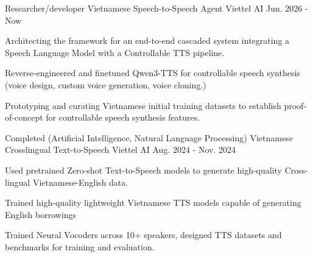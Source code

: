 \begin{cventries}
\cventry
    {Researcher/developer} %
    {Vietnamese Speech-to-Speech Agent} %
    {Viettel AI} %
    {Jun. 2026 - Now} %
    {
      \begin{cvitems} %
         \item Architecting the framework for an end-to-end cascaded system integrating a Speech Language Model with a Controllable TTS pipeline.
         \item Reverse-engineered and finetuned Qwen3-TTS for controllable speech synthesis (voice design, custom voice generation, voice cloning.)
         \item Prototyping and curating Vietnamese initial training datasets to establish proof-of-concept for controllable speech synthesis features.
      \end{cvitems}
    }


\cventry
    {Completed (Artificial Intelligence, Natural Language Processing)} %
    {Vietnamese Crosslingual Text-to-Speech} %
    {Viettel AI} %
    {Aug. 2024 - Nov. 2024} %
    {
      \begin{cvitems} %
         \item Used pretrained Zero-shot Text-to-Speech models to generate high-quality Cross-lingual Vietnamese-English data.
         \item Trained high-quality lightweight Vietnamese TTS models capable of generating English borrowings
         \item Trained Neural Vocoders across 10+ speakers, designed TTS datasets and benchmarks for training and evaluation.
      \end{cvitems}
    }

    



\end{cventries}
